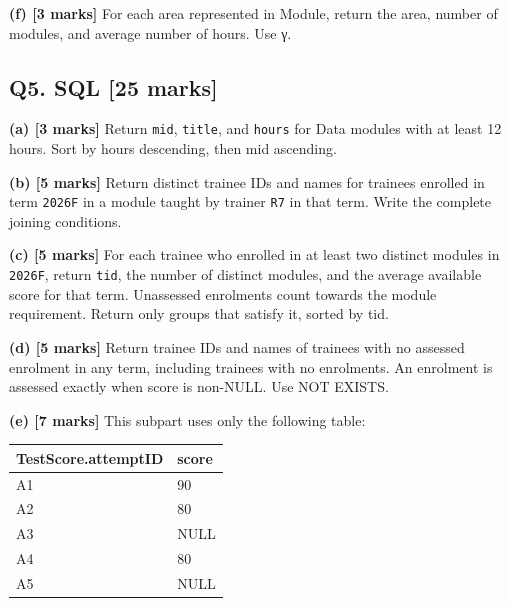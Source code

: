 \textbf{(f) {[}3 marks{]}} For each area represented in Module, return the area, number of modules, and average number of hours. Use γ.

\subsection{Q5. SQL {[}25 marks{]}}\label{practice_paper_1-q5.-sql-25-marks}

\textbf{(a) {[}3 marks{]}} Return \texttt{mid}, \texttt{title}, and \texttt{hours} for Data modules with at least 12 hours. Sort by hours descending, then mid ascending.

\textbf{(b) {[}5 marks{]}} Return distinct trainee IDs and names for trainees enrolled in term \texttt{\textquotesingle{}2026F\textquotesingle{}} in a module taught by trainer \texttt{\textquotesingle{}R7\textquotesingle{}} in that term. Write the complete joining conditions.

\textbf{(c) {[}5 marks{]}} For each trainee who enrolled in at least two distinct modules in \texttt{\textquotesingle{}2026F\textquotesingle{}}, return \texttt{tid}, the number of distinct modules, and the average available score for that term. Unassessed enrolments count towards the module requirement. Return only groups that satisfy it, sorted by tid.

\textbf{(d) {[}5 marks{]}} Return trainee IDs and names of trainees with no assessed enrolment in any term, including trainees with no enrolments. An enrolment is assessed exactly when score is non-NULL. Use NOT EXISTS.

\textbf{(e) {[}7 marks{]}} This subpart uses only the following table:

\begin{longtable}[]{@{}ll@{}}
\toprule\noalign{}
TestScore.attemptID & score \\
\midrule\noalign{}
\endhead
\bottomrule\noalign{}
\endlastfoot
A1 & 90 \\
A2 & 80 \\
A3 & NULL \\
A4 & 80 \\
A5 & NULL \\
\end{longtable}

